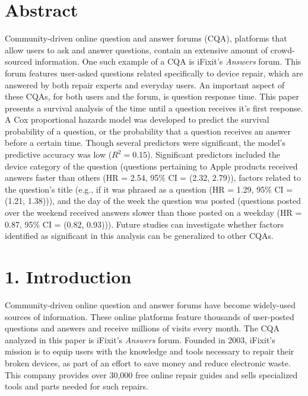 \documentclass{article}
\begin{document}


\makeatletter
\DeclareRobustCommand\bfseries{%
  \not@math@alphabet\bfseries\mathbf
  \fontseries\bfdefault\selectfont
  \boldmath %
}
\makeatother


\section*{Abstract}  

Community-driven online question and answer forums (CQA), platforms that allow users to ask and answer questions, contain an extensive amount of crowd-sourced information. One such example of a CQA is iFixit's \textit{Answers} forum. This forum features user-asked questions related specifically to device repair, which are answered by both repair experts and everyday users. An important aspect of these CQAs, for both users and the forum, is question response time. This paper presents a survival analysis of the time until a question receives it's first response. A Cox proportional hazards model was developed to predict the survival probability of a question, or the probability that a question receives an answer before a certain time. Though several predictors were significant, the model's predictive accuracy was low ($R^2 = 0.15$). Significant predictors included the device category of the question (questions pertaining to Apple products received answers faster than others (HR = 2.54, 95\% CI = (2.32, 2.79)), factors related to the question's title (e.g., if it was phrased as a question (HR = 1.29, 95\% CI = (1.21, 1.38))), and the day of the week the question was posted (questions posted over the weekend received answers slower than those posted on a weekday (HR = 0.87, 95\% CI = (0.82, 0.93))). Future studies can investigate whether factors identified as significant in this analysis can be generalized to other CQAs. 


\section*{1. Introduction}

Community-driven online question and answer forums have become widely-used sources of information. These online platforms feature thousands of user-posted questions and answers and receive millions of visits every month. The CQA analyzed in this paper is iFixit's \textit{Answers} forum. Founded in 2003, iFixit's mission is to equip users with the knowledge and tools necessary to repair their broken devices, as part of an effort to save money and reduce electronic waste. This company provides over 30,000 free online repair guides and sells specialized tools and parts needed for such repairs.
    
\end{document}
